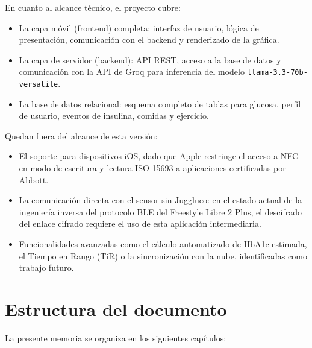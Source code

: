 En cuanto al alcance técnico, el proyecto cubre:

\begin{itemize}
    \item La capa móvil (frontend) completa: interfaz de usuario, lógica de presentación,
          comunicación con el backend y renderizado de la gráfica.
    \item La capa de servidor (backend): API REST, acceso a la base de datos y
          comunicación con la API de Groq para inferencia del modelo
          \texttt{llama-3.3-70b-versatile}.
    \item La base de datos relacional: esquema completo de tablas para glucosa, perfil
          de usuario, eventos de insulina, comidas y ejercicio.
\end{itemize}

Quedan fuera del alcance de esta versión:

\begin{itemize}
    \item El soporte para dispositivos iOS, dado que Apple restringe el acceso a NFC en
          modo de escritura y lectura ISO 15693 a aplicaciones certificadas por Abbott.
    \item La comunicación directa con el sensor sin Juggluco: en el estado actual de la
          ingeniería inversa del protocolo BLE del Freestyle Libre 2 Plus, el descifrado
          del enlace cifrado requiere el uso de esta aplicación intermediaria.
    \item Funcionalidades avanzadas como el cálculo automatizado de HbA1c estimada,
          el Tiempo en Rango (TiR) o la sincronización con la nube, identificadas como
          trabajo futuro.

\end{itemize}

\section{Estructura del documento}
\label{sec:estructura}

La presente memoria se organiza en los siguientes capítulos:

